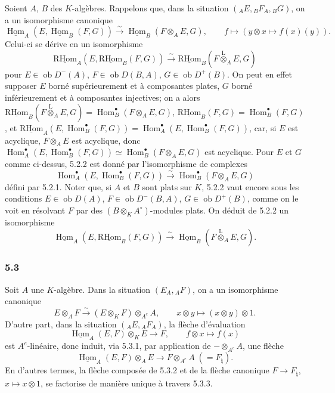 \documentclass[11pt]{article}
\DeclareMathOperator{\Hom}{Hom}
\newcommand{\R}{\mathrm{R}}\newcommand{\RHomCore}{\mathrm{RHom}}
\newcommand{\ob}{\operatorname{ob}}
\providecommand{\RHom}{\RHomCore}
\providecommand{\uRHom}{\underline{\RHom}}
\providecommand{\uHom}{\underline{\Hom}}
\providecommand{\lten}{\overset{\mathrm L}{\otimes}}
\providecommand{\RHom}{\RHomCore}
\providecommand{\Hom}{\operatorname{Hom}}
\providecommand{\ob}{\operatorname{ob}}
\providecommand{\lten}{\overset{\mathrm L}{\otimes}}
\providecommand{\RHom}{\R\mathcal{H}om}
\providecommand{\lten}{\overset{\mathrm L}{\otimes}}
\providecommand{\R}{\mathrm R}
\providecommand{\lten}{\overset{\mathrm L}{\otimes}}
\providecommand{\lten}{\overset{\mathrm L}{\otimes}}
\providecommand{\lten}{\overset{\mathrm L}{\otimes}}
\providecommand{\RHom}{\RHomCore}
\providecommand{\Hom}{\operatorname{Hom}}
\providecommand{\lten}{\overset{\mathrm L}{\otimes}}
\begin{document}
Soient $A$, $B$ des $K$-algèbres. Rappelons que, dans la situation $({}_AE,{}_BF_A,{}_BG)$, on a un isomorphisme canonique
\begin{equation}\tag{5.2.1}
\uHom_A(E,\uHom_B(F,G))\xrightarrow{\sim}\uHom_B(F\otimes_AE,G),\qquad
f\longmapsto (y\otimes x\longmapsto f(x)(y)).
\end{equation}
Celui-ci se dérive en un isomorphisme
\begin{equation}\tag{5.2.2}
\uRHom_A(E,\uRHom_B(F,G))\xrightarrow{\sim}\uRHom_B(F\lten_AE,G)
\end{equation}
pour $E\in\ob D^-(A)$, $F\in\ob D(B,A)$, $G\in\ob D^+(B)$. On peut en effet supposer $E$ borné supérieurement et à composantes plates, $G$ borné inférieurement et à composantes injectives; on a alors $\uRHom_B(F\lten_AE,G)=\Hom_B^\bullet(F\otimes_AE,G)$, $\uRHom_B(F,G)=\Hom_B^\bullet(F,G)$, et $\uRHom_A(E,\Hom_B^\bullet(F,G))=\Hom_A^\bullet(E,\Hom_B^\bullet(F,G))$, car, si $E$ est acyclique, $F\otimes_AE$ est acyclique, donc $\Hom_A^\bullet(E,\Hom_B^\bullet(F,G))\simeq\Hom_B^\bullet(F\otimes_AE,G)$ est acyclique. Pour $E$ et $G$ comme ci-dessus, 5.2.2 est donné par l'isomorphisme de complexes
\[
\Hom_A^\bullet(E,\Hom_B^\bullet(F,G))\xrightarrow{\sim}\Hom_B^\bullet(F\otimes_AE,G)
\]
défini par 5.2.1. Noter que, si $A$ et $B$ sont plats sur $K$, 5.2.2 vaut encore sous les conditions $E\in\ob D(A)$, $F\in\ob D^-(B,A)$, $G\in\ob D^+(B)$, comme on le voit en résolvant $F$ par des $(B\otimes_KA^\circ)$-modules plats. On déduit de 5.2.2 un isomorphisme
\begin{equation}\tag{5.2.3}
\uHom_A(E,\uRHom_B(F,G))\xrightarrow{\sim}\uHom_B(F\lten_AE,G).
\end{equation}

\subsubsection*{5.3}

Soit $A$ une $K$-algèbre. Dans la situation $(E_A,{}_AF)$, on a un isomorphisme canonique
\begin{equation}\tag{5.3.1}
E\otimes_AF\xrightarrow{\sim}(E\otimes_KF)\otimes_{A^e}A,
\qquad x\otimes y\longmapsto (x\otimes y)\otimes 1.
\end{equation}
D'autre part, dans la situation $({}_AE,{}_AF_A)$, la flèche d'évaluation
\begin{equation}\tag{5.3.2}
\uHom_A(E,F)\otimes_KE\longrightarrow F,
\qquad f\otimes x\longmapsto f(x)
\end{equation}
est $A^e$-linéaire, donc induit, via 5.3.1, par application de $-\otimes_{A^e}A$, une flèche
\begin{equation}\tag{5.3.3}
\uHom_A(E,F)\otimes_AE\longrightarrow F\otimes_{A^e}A\;(=F_\natural).
\end{equation}
En d'autres termes, la flèche composée de 5.3.2 et de la flèche canonique $F\to F_\natural$, $x\mapsto x\otimes 1$, se factorise de manière unique à travers 5.3.3.
\end{document}
